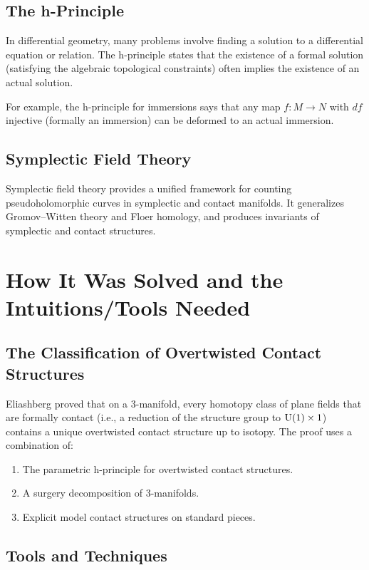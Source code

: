 \subsection{The h-Principle}

In differential geometry, many problems involve finding a solution to a differential equation or relation. The h-principle states that the existence of a formal solution (satisfying the algebraic topological constraints) often implies the existence of an actual solution.

For example, the h-principle for immersions says that any map $f: M \to N$ with $df$ injective (formally an immersion) can be deformed to an actual immersion.

\subsection{Symplectic Field Theory}

Symplectic field theory provides a unified framework for counting pseudoholomorphic curves in symplectic and contact manifolds. It generalizes Gromov--Witten theory and Floer homology, and produces invariants of symplectic and contact structures.

\section{How It Was Solved and the Intuitions/Tools Needed}

\subsection{The Classification of Overtwisted Contact Structures}

Eliashberg proved that on a 3-manifold, every homotopy class of plane fields that are formally contact (i.e., a reduction of the structure group to $\operatorname{U}(1) \times 1$) contains a unique overtwisted contact structure up to isotopy. The proof uses a combination of:
\begin{enumerate}
    \item The parametric h-principle for overtwisted contact structures.
    \item A surgery decomposition of 3-manifolds.
    \item Explicit model contact structures on standard pieces.
\end{enumerate}

\subsection{Tools and Techniques}

